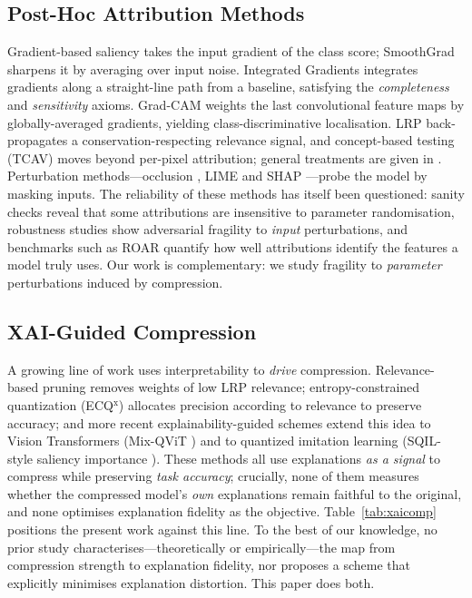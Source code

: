 \documentclass{ieeeaccess}
\begin{document}
\subsection{Post-Hoc Attribution Methods}
Gradient-based saliency \cite{simonyan2014saliency} takes the input gradient of
the class score; SmoothGrad \cite{smilkov2017smoothgrad} sharpens it by
averaging over input noise. Integrated Gradients \cite{sundararajan2017ig}
integrates gradients along a straight-line path from a baseline, satisfying the
\emph{completeness} and \emph{sensitivity} axioms. Grad-CAM
\cite{selvaraju2017gradcam} weights the last convolutional feature maps by
globally-averaged gradients, yielding class-discriminative localisation. LRP
\cite{bach2015lrp} back-propagates a conservation-respecting relevance signal,
and concept-based testing (TCAV) \cite{kim2018tcav} moves beyond per-pixel
attribution; general treatments are given in \cite{montavon2018methods,samek2021explaining}.
Perturbation methods---occlusion \cite{zeiler2014visualizing}, LIME
\cite{ribeiro2016lime} and SHAP \cite{lundberg2017shap}---probe the model by
masking inputs. The reliability of these methods has itself been questioned:
sanity checks \cite{adebayo2018sanity} reveal that some attributions are
insensitive to parameter randomisation, robustness studies
\cite{ghorbani2019interpretation} show adversarial fragility to \emph{input}
perturbations, and benchmarks such as ROAR \cite{hooker2019benchmark} quantify
how well attributions identify the features a model truly uses. Our work is complementary: we study fragility to
\emph{parameter} perturbations induced by compression.

\subsection{XAI-Guided Compression}
A growing line of work uses interpretability to \emph{drive} compression.
Relevance-based pruning \cite{yeom2021pruning} removes weights of low LRP
relevance; entropy-constrained quantization (ECQ$^{\mathrm x}$)
\cite{becking2022ecq} allocates precision according to relevance to preserve
accuracy; and more recent explainability-guided schemes extend this idea to
Vision Transformers (Mix-QViT \cite{ranjan2025mixqvit}) and to quantized
imitation learning (SQIL-style saliency importance \cite{lin2024quantimit}).
These methods all use explanations \emph{as a signal} to compress while
preserving \emph{task accuracy}; crucially, none of them measures whether the
compressed model's \emph{own} explanations remain faithful to the original, and
none optimises explanation fidelity as the objective. Table~\ref{tab:xaicomp}
positions the present work against this line. To the best of our knowledge, no
prior study characterises---theoretically or empirically---the map from
compression strength to explanation fidelity, nor proposes a scheme that
explicitly minimises explanation distortion. This paper does both.
\end{document}
